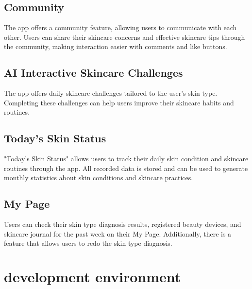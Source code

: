 \documentclass[conference]{IEEEtran}
\begin{document}
\subsection{Community}
The app offers a community feature, allowing users to communicate with each other. Users can share their skincare concerns and effective skincare tips through the community, making interaction easier with comments and like buttons. \\
\subsection{AI Interactive Skincare Challenges}
The app offers daily skincare challenges tailored to the user's skin type. Completing these challenges can help users improve their skincare habits and routines. \\
\subsection{Today's Skin Status}
"Today's Skin Status" allows users to track their daily skin condition and skincare routines through the app. All recorded data is stored and can be used to generate monthly statistics about skin conditions and skincare practices.\\
\subsection{My Page}
Users can check their skin type diagnosis results, registered beauty devices, and skincare journal for the past week on their My Page. Additionally, there is a feature that allows users to redo the skin type diagnosis.\\

\section{development environment}
\end{document}

